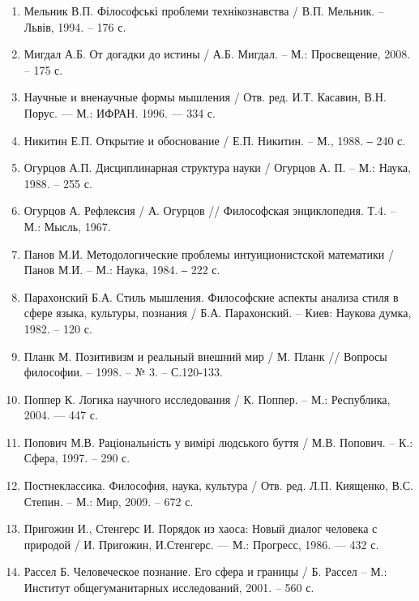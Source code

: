 \begin{enumerate}
\item Мельник В.П. Філософські проблеми технікознавства / В.П. Мельник. –
Львів, 1994. – 176 с.

\item Мигдал А.Б. От догадки до истины / А.Б. Мигдал. – М.: Просвещение,
2008. – 175 с.

\item Научные и вненаучные формы мышления / Отв. ред. И.Т. Касавин, В.Н.
Порус. --- М.: ИФРАН. 1996. --- 334 с.

\item Никитин Е.П. Открытие и обоснование / Е.П. Никитин. – М., 1988. ‒ 240
с.

\item Огурцов А.П. Дисциплинарная структура науки / Огурцов А. П. – М.:
Наука, 1988. – 255 с.

\item Огурцов А. Рефлексия / А. Огурцов // Философская энциклопедия. Т.4. –
М.: Мысль, 1967.

\item Панов М.И. Методологические проблемы интуиционистской
математики / Панов М.И. – М.: Наука, 1984. ‒ 222 с.

\item Парахонский Б.А. Стиль мышления. Философские аспекты анализа
стиля в сфере язы\-ка, культуры, познания / Б.А. Парахонский. – Киев: Наукова
думка, 1982. – 120 с.

\item Планк М. Позитивизм и реальный внешний мир / М. Планк // Вопросы
философии. – 1998. – № 3. – С.120-133.

\item Поппер К. Логика научного исследования / К. Поппер. – М.: Республика,
2004. --- 447 с.

\item Попович М.В. Раціональність у вимірі людського буття / М.В. Попович.
– К.: Сфера, 1997. – 290 с.

\item Постнеклассика. Философия, наука, культура / Отв. ред. Л.П. Киященко,
В.С. Степин. – М.: Мир, 2009. – 672 с.

\item Пригожин И., Стенгерс И. Порядок из хаоса: Новый диалог человека с
природой / И. Пригожин, И.Стенгерс. --- М.: Прогресс, 1986. --- 432 с.

\item Рассел Б. Человеческое познание. Его сфера и границы / Б. Рассел – М.:
Институт общегуманитарных исследований, 2001. – 560 с.


\end{enumerate}
